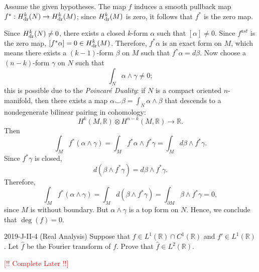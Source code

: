 \documentclass{article}
\begin{document}
\begin{solutions}
	Assume the given hypotheses. The map $f$ induces a smooth pullback map $f^{\ast}: H^{k}_{\text{dr}}(N) \to H^{k}_{\text{dr}}(M)$; since $H^{k}_{\text{dr}}(M)$ is zero, it follows that $f^{\ast}$ is the zero map. 
	
	Since $H^{k}_{\text{dr}}(N) \neq 0$, there exists a closed $k$-form $\alpha$ such that $[\alpha] \neq 0$. Since $f^{ast}$ is the zero map, $[f^{\ast}\alpha] = 0 \in H^{k}_{\text{dr}}(M)$. Therefore, $f^{\ast}\alpha$ is an exact form on $M$, which means there exists a $(k - 1)$-form $\beta$ on $M$ such that $f^{\ast}\alpha = d\beta$. Now choose a $(n - k)$-form $\gamma$ on $N$ such that 
		\begin{equation}
			\int_{N}\alpha \wedge \gamma \neq 0; 
		\end{equation} 
	this is possible due to the \textit{Poincar{\'e} Duality}: if $N$ is a compact oriented $n$-manifold, then there exists a map $\alpha \smile \beta = \int_{N} \alpha \wedge \beta$ that descends to a nondegenerate bilinear pairing in cohomology:
		\begin{equation}
			H^{k}(M, \mathbb{R}) \otimes H^{n - k}(M, \mathbb{R}) \to \mathbb{R}. 
		\end{equation}
	Then 
		\begin{equation}
			\int_{M}f^{\ast}(\alpha \wedge \gamma) = \int_{M}f^{\ast}\alpha \wedge f^{\ast}\gamma = \int_{M}d\beta \wedge f^{\ast}\gamma. 
		\end{equation}
	Since $f^{\ast}\gamma$ is closed, 
		\begin{equation}
			d(\beta \wedge f^{\ast}\gamma) = d\beta \wedge f^{\ast}\gamma. 
		\end{equation}
	Therefore, 
		\begin{equation}
			\int_{M}f^{\ast}(\alpha \wedge \gamma) = \int_{M}d(\beta \wedge f^{\ast}\gamma) = \int_{\partial M}\beta \wedge f^{\ast}\gamma = 0, 
		\end{equation} 
	since $M$ is without boundary. But $\alpha \wedge \gamma$ is a top form on $N$. Hence, we conclude that $\operatorname{deg}(f) = 0$. 
\end{solutions}


\begin{prb}{2019-J-II-4 (Real Analysis)}
	Suppose that $f \in L^{1}(\mathbb{R}) \cap C^{1}(\mathbb{R})$ and $f' \in L^{1}(\mathbb{R})$. Let $\hat{f}$ be the Fourier transform of $f$. Prove that $\hat{f} \in L^{2}(\mathbb{R})$. 
\end{prb}
\begin{solutions}
	\textcolor{red}{[!! Complete Later !!]}
\end{solutions}
\end{document}
